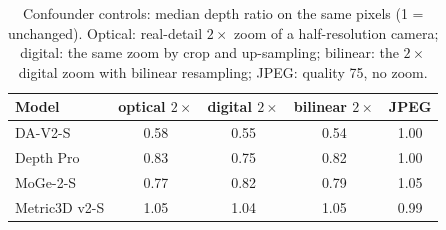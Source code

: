 \begin{table}[t]\centering\small
\caption{Confounder controls: median depth ratio on the same pixels (1 = unchanged). Optical: real-detail $2\times$ zoom of a half-resolution camera; digital: the same zoom by crop and up-sampling; bilinear: the $2\times$ digital zoom with bilinear resampling; JPEG: quality 75, no zoom.}\label{tab:controls}
\setlength{\tabcolsep}{4pt}
\begin{tabular}{lcccc}\toprule
Model & optical $2\times$ & digital $2\times$ & bilinear $2\times$ & JPEG \\ \midrule
DA-V2-S & 0.58 & 0.55 & 0.54 & 1.00 \\
Depth Pro & 0.83 & 0.75 & 0.82 & 1.00 \\
MoGe-2-S & 0.77 & 0.82 & 0.79 & 1.05 \\
Metric3D v2-S & 1.05 & 1.04 & 1.05 & 0.99 \\
\bottomrule\end{tabular}\end{table}
